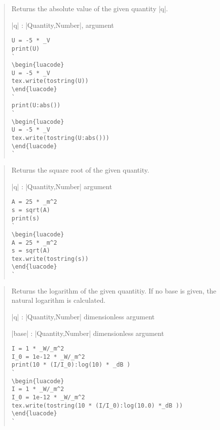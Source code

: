 \documentclass{ltxdoc}
\begin{document}
\begin{quote}
  Returns the absolute value of the given quantity |q|.

  \begin{description}
  \item |q| : |Quantity,Number|, argument
  \end{description}


\begin{lstlisting}
U = -5 * _V
print(U)
`
\begin{luacode}
U = -5 * _V
tex.write(tostring(U))
\end{luacode}
`
print(U:abs())
`
\begin{luacode}
U = -5 * _V
tex.write(tostring(U:abs()))
\end{luacode}
`
\end{lstlisting}
\end{quote}




\begin{quote}
  Returns the square root of the given quantity.

  \begin{description}
  \item |q| : |Quantity,Number| argument
  \end{description}


\begin{lstlisting}
A = 25 * _m^2
s = sqrt(A)
print(s)
`
\begin{luacode}
A = 25 * _m^2
s = sqrt(A)
tex.write(tostring(s))
\end{luacode}
`
\end{lstlisting}
\end{quote}



\begin{quote}
  Returns the logarithm of the given quantitiy. If no base is given, the natural logarithm is calculated.

  \begin{description}
  \item |q| : |Quantity,Number| dimensionless argument
  \item |base| : |Quantity,Number| dimensionless argument
  \end{description}


\begin{lstlisting}
I = 1 * _W/_m^2
I_0 = 1e-12 * _W/_m^2
print(10 * (I/I_0):log(10) * _dB )
`
\begin{luacode}
I = 1 * _W/_m^2
I_0 = 1e-12 * _W/_m^2
tex.write(tostring(10 * (I/I_0):log(10.0) *_dB ))
\end{luacode}
`
\end{lstlisting}
\end{quote}
\end{document}
